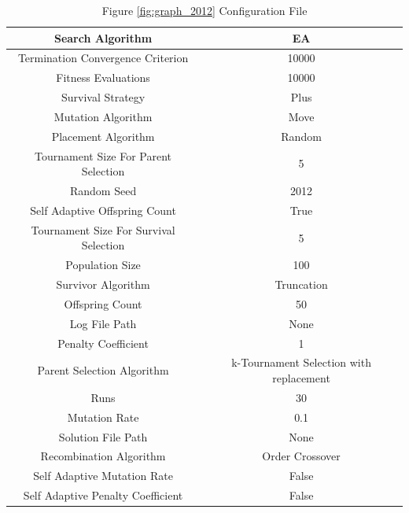 \documentclass{standalone}
\begin{document}
\begin{table}[!htb]
	\centering
	\caption{Figure \ref{fig:graph_2012} Configuration File}
	\label{tab:graph_2012}
	\begin{tabular}{| c | c |}
		\hline
		Search Algorithm		& EA		 \\
		\hline
		Termination Convergence Criterion		& 10000		 \\
		\hline
		Fitness Evaluations		& 10000		 \\
		\hline
		Survival Strategy		& Plus		 \\
		\hline
		Mutation Algorithm		& Move		 \\
		\hline
		Placement Algorithm		& Random		 \\
		\hline
		Tournament Size For Parent Selection		& 5		 \\
		\hline
		Random Seed		& 2012		 \\
		\hline
		Self Adaptive Offspring Count		& True		 \\
		\hline
		Tournament Size For Survival Selection		& 5		 \\
		\hline
		Population Size		& 100		 \\
		\hline
		Survivor Algorithm		& Truncation		 \\
		\hline
		Offspring Count		& 50		 \\
		\hline
		Log File Path		& None		 \\
		\hline
		Penalty Coefficient		& 1		 \\
		\hline
		Parent Selection Algorithm		& k-Tournament Selection with replacement		 \\
		\hline
		Runs		& 30		 \\
		\hline
		Mutation Rate		& 0.1		 \\
		\hline
		Solution File Path		& None		 \\
		\hline
		Recombination Algorithm		& Order Crossover		 \\
		\hline
		Self Adaptive Mutation Rate		& False		 \\
		\hline
		Self Adaptive Penalty Coefficient		& False		 \\
		\hline
	\end{tabular}
\end{table}
\end{document}
